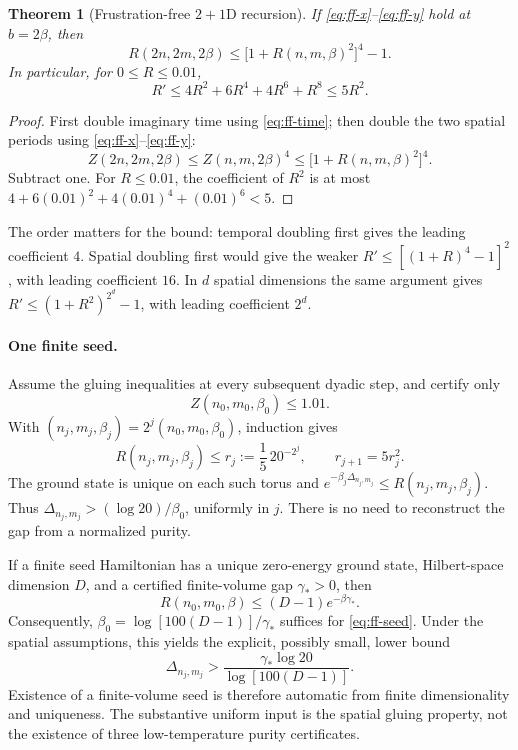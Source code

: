 \documentclass[11pt]{article}
\newtheorem{theorem}{Theorem}
\begin{document}
\begin{theorem}[Frustration-free \(2+1\)D recursion]
	If \eqref{eq:ff-x}--\eqref{eq:ff-y} hold at \(b=2\beta\), then
	\begin{equation}
		\boxed{R(2n,2m,2\beta)
			\le\bigl[1+R(n,m,\beta)^2\bigr]^4-1.}
		\label{eq:ff-update}
	\end{equation}
	In particular, for \(0\le R\le0.01\),
	\begin{equation}
		\boxed{R'\le4R^2+6R^4+4R^6+R^8\le5R^2.}
		\label{eq:ff-quadratic}
	\end{equation}
\end{theorem}

\begin{proof}
	First double imaginary time using \eqref{eq:ff-time}; then double
	the two spatial periods using \eqref{eq:ff-x}--\eqref{eq:ff-y}:
	\[
		Z(2n,2m,2\beta)\le Z(n,m,2\beta)^4
		\le\bigl[1+R(n,m,\beta)^2\bigr]^4.
	\]
	Subtract one. For \(R\le0.01\), the coefficient of \(R^2\) is at
	most \(4+6(0.01)^2+4(0.01)^4+(0.01)^6<5\).
\end{proof}

The order matters for the bound: temporal doubling first gives the
leading coefficient \(4\). Spatial doubling first would give the
weaker \(R'\le[(1+R)^4-1]^2\), with leading coefficient \(16\).
In \(d\) spatial dimensions the same argument gives
\(R'\le(1+R^2)^{2^d}-1\), with leading coefficient \(2^d\).

\paragraph{One finite seed.}
Assume the gluing inequalities at every subsequent dyadic step, and
certify only
\begin{equation}
	Z(n_0,m_0,\beta_0)\le1.01.
	\label{eq:ff-seed}
\end{equation}
With \((n_j,m_j,\beta_j)=2^j(n_0,m_0,\beta_0)\), induction gives
\begin{equation}
	R(n_j,m_j,\beta_j)\le r_j:=\frac15\,20^{-2^j},
	\qquad r_{j+1}=5r_j^2.
	\label{eq:ff-scales}
\end{equation}
The ground state is unique on each such torus and
\(e^{-\beta_j\Delta_{n_j,m_j}}\le R(n_j,m_j,\beta_j)\).
Thus \(\Delta_{n_j,m_j}>(\log20)/\beta_0\), uniformly in \(j\).
There is no need to reconstruct the gap from a normalized purity.

If a finite seed Hamiltonian has a unique zero-energy ground state,
Hilbert-space dimension \(D\), and a certified finite-volume gap
\(\gamma_*>0\), then
\[
	R(n_0,m_0,\beta)\le(D-1)e^{-\beta\gamma_*}.
\]
Consequently, \(\beta_0=\log[100(D-1)]/\gamma_*\) suffices for
\eqref{eq:ff-seed}. Under the spatial assumptions, this yields the
explicit, possibly small, lower bound
\begin{equation}
	\Delta_{n_j,m_j}>
	\frac{\gamma_*\log20}{\log[100(D-1)]}.
	\label{eq:ff-finite-gap}
\end{equation}
Existence of a finite-volume seed is therefore automatic from finite
dimensionality and uniqueness. The substantive uniform input is the
spatial gluing property, not the existence of three low-temperature
purity certificates.
\end{document}
